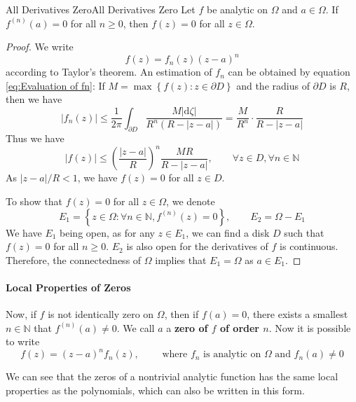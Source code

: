 \documentclass[../main.tex]{subfiles}
\begin{document}
\begin{theorem}{All Derivatives Zero}{All Derivatives Zero}
	Let $f$ be analytic on $\Omega$ and $a\in \Omega$. If $f^{(n)}(a) = 0$ for all $n\geq 0$, then $f(z) = 0$ for all $z\in \Omega$.
\end{theorem}
\begin{proof}
We write
\begin{equation*}
f(z) = f_n(z) (z-a)^n
\end{equation*}
according to Taylor's theorem. An estimation of $f_n$ can be obtained by equation \ref{eq:Evaluation of fn}: If $M = \max \left\{ f(z): z\in \partial D \right\}$ and the radius of $\partial D$ is $R$, then we have
\begin{equation*}
	\left|f_n(z)\right| \leq \frac{1}{2 \pi }\int_{\partial D} \frac{M \left|\mathrm{d} \zeta\right|}{R^n(R-\left|z-a\right|)} = \frac{M}{R^n} \cdot \frac{R}{R-\left|z-a\right|}
\end{equation*}
Thus we have
\begin{equation*}
\left|f(z)\right| \leq \left(\frac{\left|z-a\right|}{R}\right)^n \frac{MR}{R-\left|z-a\right|}, \qquad \forall z\in D, \forall n\in \mathbb{N}
\end{equation*}
As $\left|z-a\right| / R < 1$, we have $f(z) = 0$ for all $z\in D$.

To show that $f(z)=0$ for all $z\in \Omega$, we denote
\begin{equation*}
E_1 = \left\{ z\in \Omega: \forall n\in \mathbb{N}, f^{(n)}(z) = 0 \right\}, \qquad E_2=\Omega-E_1
\end{equation*}
We have $E_1$ being open, as for any $z\in E_1$, we can find a disk $D$ such that $f(z) = 0$ for all $n\geq 0$. $E_2$ is also open for the derivatives of $f$ is continuous. Therefore, the connectedness of $\Omega$ implies that $E_1 = \Omega$ as $a\in E_1$.
\end{proof}

\paragraph{Local Properties of Zeros}

Now, if $f$ is not identically zero on $\Omega$, then if $f(a) = 0$, there exists a smallest $n\in \mathbb{N}$ that $f^{(n)}(a) \neq 0$. We call $a$ a \textbf{zero of $f$ of order $n$}. Now it is possible to write
\begin{equation}
	f(z) = (z-a)^n f_n(z), \qquad \text{ where } f_n \text{ is analytic on } \Omega \text{ and } f_n(a) \neq 0
\end{equation}
\begin{remark}
We can see that the zeros of a nontrivial analytic function has the same local properties as the polynomials, which can also be written in this form.
\end{remark}
\end{document}
